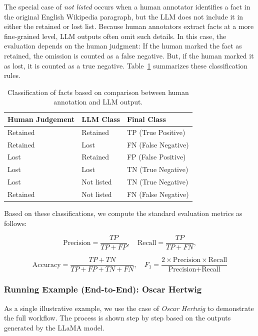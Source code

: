\documentclass{DESSThesis}
\begin{document}
The special case of \textit{not listed} occurs when a human annotator identifies a fact in the original English Wikipedia paragraph, but the LLM does not include it in either the retained or lost list. Because human annotators extract facts at a more fine-grained level, LLM outputs often omit such details. In this case, the evaluation depends on the human judgment: If the human marked the fact as retained, the omission is counted as a false negative. But, if the human marked it as lost, it is counted as a true negative. Table~\ref{tab:fact-classification} summarizes these classification rules.

\begin{table}[h]
\centering
\begin{tabular}{lll}
\toprule
\textbf{Human Judgement} & \textbf{LLM Class} & \textbf{Final Class} \\
\midrule
Retained & Retained & TP (True Positive) \\
Retained & Lost & FN (False Negative) \\
Lost & Retained & FP (False Positive) \\
Lost & Lost & TN (True Negative) \\
Lost & Not listed & TN (True Negative) \\
Retained & Not listed & FN (False Negative) \\
\bottomrule
\end{tabular}
\caption{Classification of facts based on comparison between human annotation and LLM output.}
\label{tab:fact-classification}
\end{table}

Based on these classifications, we compute the standard evaluation metrics as follows:  

\[
\text{Precision} = \frac{TP}{TP + FP}, \quad
\text{Recall} = \frac{TP}{TP + FN},
\]

\[
\text{Accuracy} = \frac{TP + TN}{TP + FP + TN + FN}, \quad
F_1 = \frac{2 \times \text{Precision} \times \text{Recall}}{\text{Precision} + \text{Recall}}
\]

\subsubsection*{Running Example (End-to-End): Oscar Hertwig}

As a single illustrative example, we use the case of \textit{Oscar Hertwig} to demonstrate the full workflow. The process is shown step by step based on the outputs generated by the LLaMA model.
\end{document}
